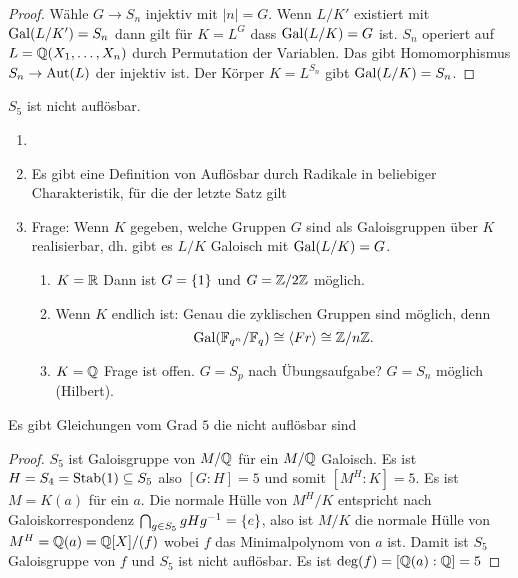 \begin{proof}
	Wähle \(G\to S_n\) injektiv mit \(|n|=G\). Wenn \(L/K'\) existiert mit \(\operatorname{Gal}(L/K')=S_n\) dann gilt für \(K=L^G\) dass \(\operatorname{Gal}(L/K)=G\) ist.
	\(S_n\) operiert auf \(L=\mathbb{Q}(X_1,\dots,X_n)\) durch Permutation der Variablen. Das gibt Homomorphismus \(S_n\to\operatorname{Aut}(L)\) der injektiv ist. Der Körper \(K=L^{S_n}\) gibt \(\operatorname{Gal}(L/K)=S_n\).
\end{proof}
\begin{Bem}
	\(S_5\) ist nicht auflösbar. 
\end{Bem}
\begin{Bem}
	\begin{enumerate}
		\item[]
		\item Es gibt eine Definition von Auflösbar durch Radikale in beliebiger Charakteristik, für die der letzte Satz gilt
		\item Frage: Wenn \(K\) gegeben, welche Gruppen \(G\) sind als Galoisgruppen über \(K\) realisierbar, dh. gibt es \(L/K\) Galoisch mit \(\operatorname{Gal}(L/K)=G\).
		\begin{enumerate}
			\item \(K=\mathbb{R}\) Dann ist \(G=\{1\}\) und \(G=\mathbb{Z}/2\mathbb{Z}\) möglich.
			\item Wenn \(K\) endlich ist: Genau die zyklischen Gruppen sind möglich, denn \[\operatorname{Gal}(\mathbb{F}_{q^n}/\mathbb{F}_q)\cong\langle Fr\rangle\cong\mathbb{Z}/n\mathbb{Z}.\]
			\item \(K=\mathbb{Q}\) Frage ist offen. \(G=S_p\) nach Übungsaufgabe?
			\(G=S_n\) möglich (Hilbert).
		\end{enumerate}
	\end{enumerate}
\end{Bem}
\begin{Satz}
	Es gibt Gleichungen vom Grad \(5\) die nicht auflösbar sind
\end{Satz}
\begin{proof}
	\(S_5\) ist Galoisgruppe von \(M/\mathbb{Q}\) für ein \(M/\mathbb{Q}\) Galoisch. Es ist \(H=S_4=\operatorname{Stab}(1)\subseteq S_5\) also \([G:H]=5\) und somit \([M^H:K]=5\). Es ist \(M=K(a)\) für ein \(a\). Die normale Hülle von \(M^H/K\) entspricht nach Galoiskorrespondenz \(\bigcap_{g\in S_5}gHg^{-1}=\{e\}\), also ist \(M/K\) die normale Hülle von \(M^H=\mathbb{Q}(a)=\mathbb{Q}[X]/(f)\) wobei \(f\) das Minimalpolynom von \(a\) ist. Damit ist \(S_5\) Galoisgruppe von \(f\) und \(S_5\) ist nicht auflösbar. Es ist \(\deg(f)=[\mathbb{Q}(a):\mathbb{Q}]=5\)
\end{proof}